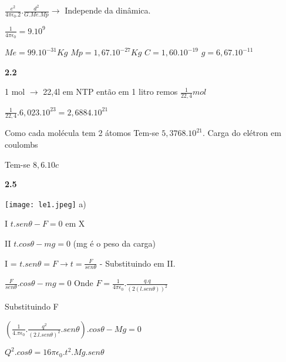 \documentclass{article}
\begin{document}
$\frac{e^2}{4\pi\epsilon_0 . 2}.\frac{d^2}{G.Me.Mp} \rightarrow$ Independe da dinâmica.\newline

$\frac{1}{4\pi\epsilon_0} = 9.10^9$

$Me = 99.10^{-31}Kg$\newline
$Mp = 1,67.10^{-27}Kg$\newline
$C = 1,60 . 10^{-19}$\newline
$g = 6,67.10^{-11}$\newline

\textbf{2.2}\newline

1 mol $\rightarrow$ 22,4l em NTP\newline
então em 1 litro remos $\frac{1}{22,4}mol$\newline

$\frac{1}{22,4}.6,023.10^23 = 2,6884.10^21$\newline

Como cada molécula tem 2 átomos\newline
Tem-se $5,3768.10^21$. Carga do elétron em coulombs\newline

Tem-se $8,6.10c$\newline

\textbf{2.5}\newline

\texttt{[image: le1.jpeg]}\newline
a)\newline

I $t.sen\theta - F = 0$ em X\newline

II $t.cos\theta - mg = 0$\newline
(mg é o peso da carga)\newline

I = $t.sen\theta = F \rightarrow t = \frac{F}{sen\theta}$ - Substituindo em II.\newline

$\frac{F}{sen\theta}.cos\theta - mg = 0$ Onde $F = \frac{1}{4\pi\epsilon_0}.\frac{q.q}{(2(l.sen\theta))^2}$\newline

Substituindo F\newline

$(\frac{1}{4.\pi\epsilon_0}.\frac{q^2}{(2.l.sen\theta)^2}. sen\theta).cos\theta - Mg = 0$\newline

$Q^2.cos\theta = 16\pi\epsilon_0.t^2.Mg.sen\theta$\newline
\end{document}
